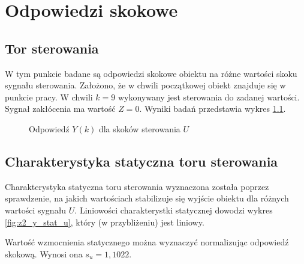 \chapter{Odpowiedzi skokowe}
\section{Tor sterowania}
W tym punkcie badane są odpowiedzi skokowe obiektu na różne wartości skoku sygnału sterowania. Założono, że w chwili początkowej obiekt znajduje się w punkcie pracy. W chwili $k=9$ wykonywany jest sterowania do zadanej wartości. Sygnał zakłócenia ma wartość $Z=0$. Wyniki badań przedstawia wykres \ref{fig:z2_yu}.
\begin{figure}[!htb]
	\centering
	\caption{Odpowiedź $Y(k)$ dla skoków sterowania $U$}
\label{fig:z2_yu}
\end{figure}

\section{Charakterystyka statyczna toru sterowania}
Charakterystyka statyczna toru sterowania wyznaczona została poprzez sprawdzenie, na jakich wartościach stabilizuje się wyjście obiektu dla różnych wartości sygnału $U$. Liniowości charakterystki statycznej dowodzi wykres \ref{fig:z2_y_stat_u}, który (w przybliżeniu) jest liniowy.

Wartość wzmocnienia statycznego można wyznaczyć normalizując odpowiedź skokową. Wynosi ona $s_u=1,1022$.

